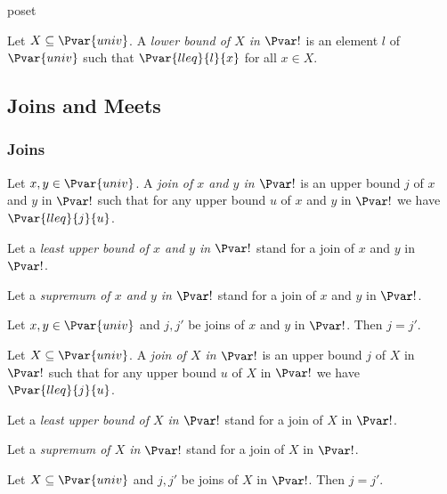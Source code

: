 \documentclass{stex}
\begin{document}
\begin{smodule}{poset}
\begin{forthel}
    \begin{definition}
      Let $X\subseteq\Pvar{univ}$.
      A \emph{lower bound of $X$ in $\Pvar!$} is an element $l$ of $\Pvar{univ}$ such that $\Pvar{lleq}{l}{x}$ for all $x\in X$.
    \end{definition}
  \end{forthel}

  \subsection{Joins and Meets}

  \subsubsection{Joins}

  \begin{forthel}
    \begin{definition}
      Let $x,y\in\Pvar{univ}$.
      A \emph{join of $x$ and $y$ in $\Pvar!$} is an upper bound $j$ of $x$ and $y$ in $\Pvar!$ such that for any upper bound $u$ of $x$ and $y$ in $\Pvar!$ we have $\Pvar{lleq}{j}{u}$.
    \end{definition}

    Let a \emph{least upper bound of $x$ and $y$ in $\Pvar!$} stand for a join of $x$ and $y$ in $\Pvar!$.

    Let a \emph{supremum of $x$ and $y$ in $\Pvar!$} stand for a join of $x$ and $y$ in $\Pvar!$.

    \begin{proposition}
      Let $x,y\in\Pvar{univ}$ and $j,j'$ be joins of $x$ and $y$ in $\Pvar!$.
      Then $j=j'$.
    \end{proposition}
    
    \begin{definition}
      Let $X\subseteq\Pvar{univ}$.
      A \emph{join of $X$ in $\Pvar!$} is an upper bound $j$ of $X$ in $\Pvar!$ such that for any upper bound $u$ of $X$ in $\Pvar!$ we have $\Pvar{lleq}{j}{u}$.
    \end{definition}

    Let a \emph{least upper bound of $X$ in $\Pvar!$} stand for a join of $X$ in $\Pvar!$.

    Let a \emph{supremum of $X$ in $\Pvar!$} stand for a join of $X$ in $\Pvar!$.

    \begin{proposition}
      Let $X\subseteq\Pvar{univ}$ and $j,j'$ be joins of $X$ in $\Pvar!$.
      Then $j=j'$.
    \end{proposition}
  \end{forthel}


\end{smodule}
\end{document}

